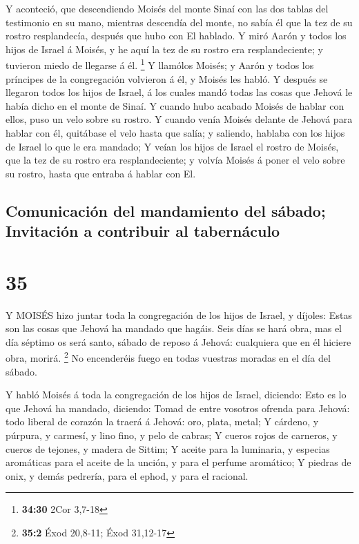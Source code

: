  Y aconteció, que descendiendo Moisés del monte Sinaí con
las dos tablas del testimonio en su mano, mientras descendía del monte,
no sabía él que la tez de su rostro resplandecía, después que hubo con
El hablado.  Y miró Aarón y todos los hijos de Israel á
Moisés, y he aquí la tez de su rostro era resplandeciente; y tuvieron
miedo de llegarse á él. \footnote{\textbf{34:30} 2Cor 3,7-18}
 Y llamólos Moisés; y Aarón y todos los príncipes de la
congregación volvieron á él, y Moisés les habló.  Y después
se llegaron todos los hijos de Israel, á los cuales mandó todas las
cosas que Jehová le había dicho en el monte de Sinaí.  Y
cuando hubo acabado Moisés de hablar con ellos, puso un velo sobre su
rostro.  Y cuando venía Moisés delante de Jehová para
hablar con él, quitábase el velo hasta que salía; y saliendo, hablaba
con los hijos de Israel lo que le era mandado;  Y veían los
hijos de Israel el rostro de Moisés, que la tez de su rostro era
resplandeciente; y volvía Moisés á poner el velo sobre su rostro, hasta
que entraba á hablar con El.

\hypertarget{comunicaciuxf3n-del-mandamiento-del-suxe1bado-invitaciuxf3n-a-contribuir-al-tabernuxe1culo}{%
\subsection{Comunicación del mandamiento del sábado; Invitación a
contribuir al
tabernáculo}\label{comunicaciuxf3n-del-mandamiento-del-suxe1bado-invitaciuxf3n-a-contribuir-al-tabernuxe1culo}}

\hypertarget{section-34}{%
\section{35}\label{section-34}}

 Y MOISÉS hizo juntar toda la congregación de los hijos de
Israel, y díjoles: Estas son las cosas que Jehová ha mandado que hagáis.
 Seis días se hará obra, mas el día séptimo os será santo,
sábado de reposo á Jehová: cualquiera que en él hiciere obra, morirá.
\footnote{\textbf{35:2} Éxod 20,8-11; Éxod 31,12-17}  No
encenderéis fuego en todas vuestras moradas en el día del sábado.

 Y habló Moisés á toda la congregación de los hijos de
Israel, diciendo: Esto es lo que Jehová ha mandado, diciendo:
 Tomad de entre vosotros ofrenda para Jehová: todo liberal
de corazón la traerá á Jehová: oro, plata, metal;  Y
cárdeno, y púrpura, y carmesí, y lino fino, y pelo de cabras;
 Y cueros rojos de carneros, y cueros de tejones, y madera
de Sittim;  Y aceite para la luminaria, y especias
aromáticas para el aceite de la unción, y para el perfume aromático;
 Y piedras de onix, y demás pedrería, para el ephod, y para
el racional.

